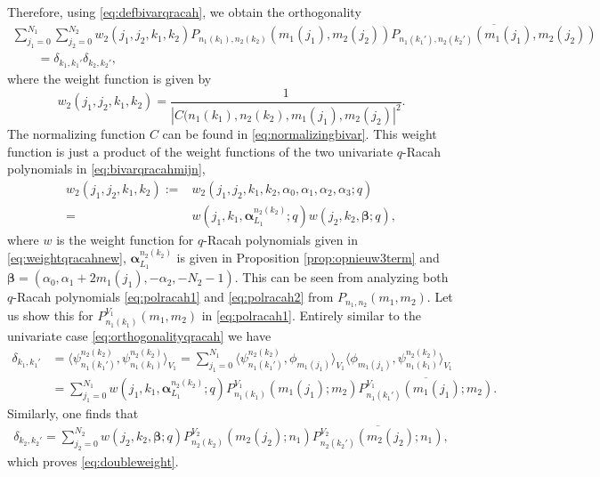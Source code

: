 \documentclass[pdftex]{sigma}
\numberwithin{equation}{section}
\begin{document}
\begin{Remark}
\begin{gather*}
	\end{gather*}
	Therefore, using \eqref{eq:defbivarqracah}, we obtain the orthogonality
	\begin{gather*}
		\sum_{j_1=0}^{N_1}\sum_{j_2=0}^{N_2} w_2(j_1,j_2,k_1,k_2) P_{n_1(k_1),n_2(k_2)}(m_1(j_1),m_2(j_2))\overline{P_{n_1(k_1'),n_2(k_2')}(m_1(j_1),m_2(j_2))} \\
		\qquad{} =\delta_{k_1,k_1'}\delta_{k_2,k_2'} ,
	\end{gather*}
	where the weight function is given by
	\[
	w_2(j_1,j_2,k_1,k_2)=\frac{1}{|C(n_1(k_1),n_2(k_2),m_1(j_1),m_2(j_2)|^2}.
	\]
	The normalizing function $C$ can be found in \eqref{eq:normalizingbivar}. This weight function is just a product of the weight functions of the two univariate $q$-Racah polynomials in \eqref{eq:bivarqracahmijn},
	\begin{align}
		w_2(j_1,j_2,k_1,k_2):={}& w_2(j_1,j_2,k_1,k_2,\alpha_0,\alpha_1,\alpha_2,\alpha_3;q)\nonumber\\
={}& w(j_1,k_1,\bm{\alpha}_{L_1}^{n_2(k_2)};q)w(j_2,k_2,\bm{\beta};q),\label{eq:doubleweight}
	\end{align}	
	where $w$ is the weight function for $q$-Racah polynomials given in \eqref{eq:weightqracahnew}, $\bm{\alpha}_{L_1}^{n_2(k_2)}$ is given in Proposition \ref{prop:opnieuw3term} and $\bm{\beta}=(\alpha_0,\alpha_1+2m_1(j_1),-\alpha_2,-N_2-1)$. This can be seen from analyzing both $q$-Racah polynomials \eqref{eq:polracah1} and \eqref{eq:polracah2} from $P_{n_1,n_2}(m_1,m_2)$. Let us show this for $P_{n_1(k_1)}^{V_1}(m_1,m_2)$ in \eqref{eq:polracah1}. Entirely similar to the univariate case \eqref{eq:orthogonalityqracah} we have
	\begin{align*}
		\delta_{k_1,k_1'}&=\big\langle \psi_{n_1(k_1')}^{n_2(k_2)},\psi_{n_1(k_1)}^{n_2(k_2)}\big\rangle _{V_1}=\sum_{j_1=0}^{N_1} \big\langle \psi_{n_1(k_1')}^{n_2(k_2)},\phi_{m_1(j_1)}\big\rangle _{V_1}\big\langle \phi_{m_1(j_1)},\psi_{n_1(k_1)}^{n_2(k_2)}\big\rangle _{V_1} \\
		&= \sum_{j_1=0}^{N_1} w(j_1,k_1,\bm{\alpha}_{L_1}^{n_2(k_2)};q)P_{n_1(k_1)}^{V_1}(m_1(j_1);m_2)\overline{P_{n_1(k_1')}^{V_1}(m_1(j_1);m_2)}.%
	\end{align*}
	Similarly, one finds that
	\begin{gather*}
		\delta_{k_2,k_2'}=\sum_{j_2=0}^{N_2} w(j_2,k_2,\bm{\beta};q)P_{n_2(k_2)}^{V_2}(m_2(j_2);n_1)\overline{P_{n_2(k_2')}^{V_2}(m_2(j_2);n_1)},%
	\end{gather*}
	which proves \eqref{eq:doubleweight}.
\end{Remark}
\end{document}
